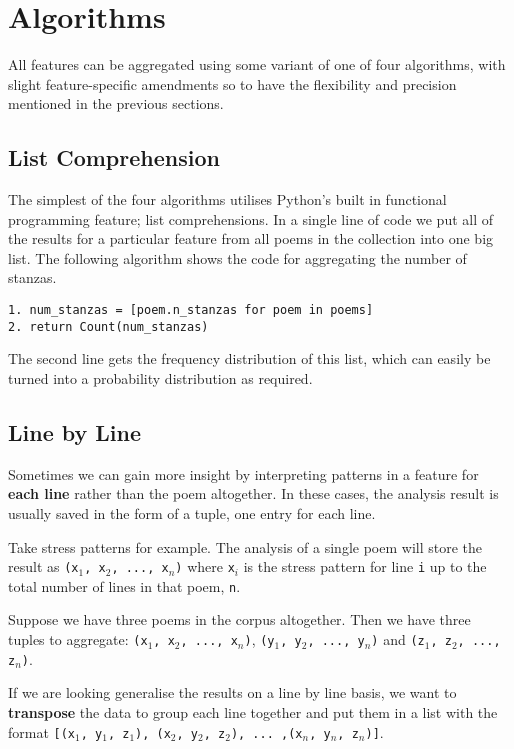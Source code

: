 \section{Algorithms}

All features can be aggregated using some variant of one of four algorithms, with slight feature-specific amendments so to have the flexibility and precision mentioned in the previous sections.

\subsection{List Comprehension}
\label{sec:listcomp}

The simplest of the four algorithms utilises Python's built in functional programming feature; list comprehensions. In a single line of code we put all of the results for a particular feature from all poems in the collection into one big list. The following algorithm shows the code for aggregating the number of stanzas.

\begin{verbatim}
1. num_stanzas = [poem.n_stanzas for poem in poems]
2. return Count(num_stanzas)
\end{verbatim}

The second line gets the frequency distribution of this list, which can easily be turned into a probability distribution as required.


\subsection{Line by Line}

Sometimes we can gain more insight by interpreting patterns in a feature for \textbf{each line} rather than the poem altogether. In these cases, the analysis result is usually saved in the form of a tuple, one entry for each line.

Take stress patterns for example. The analysis of a single poem will store the result as \texttt{(x$_1$, x$_2$, ..., x$_n$)} where \texttt{x$_i$} is the stress pattern for line \texttt{i} up to the total number of lines in that poem, \texttt{n}.

Suppose we have three poems in the corpus altogether. Then we have three tuples to aggregate: \texttt{(x$_1$, x$_2$, ..., x$_n$)}, \texttt{(y$_1$, y$_2$, ..., y$_n$)} and \texttt{(z$_1$, z$_2$, ..., z$_n$)}. 

If we are looking generalise the results on a line by line basis, we want to \textbf{transpose} the data to group each line together and put them in a list with the format \texttt{[(x$_1$, y$_1$, z$_1$), (x$_2$, y$_2$, z$_2$), ... ,(x$_n$, y$_n$, z$_n$)]}.

